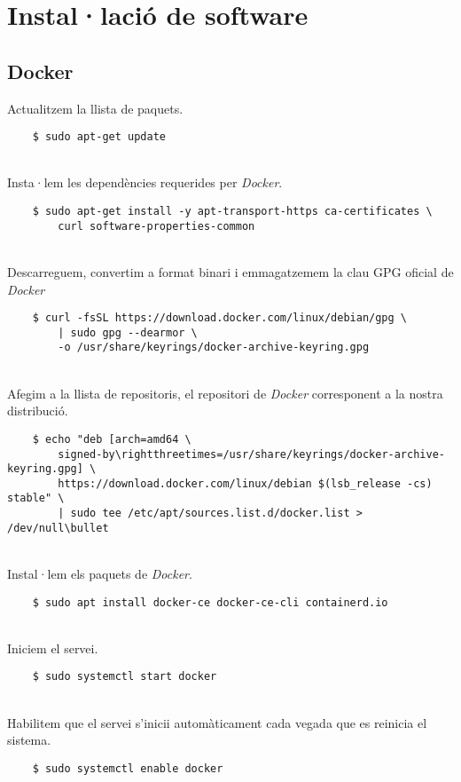 \chapter{Instal·lació de software}\label{ch:software-installation}

\section*{\gls{Docker}}\label{sec:docker-installation}

Actualitzem la llista de paquets.
\begin{verbatim}
    $ sudo apt-get update
\end{verbatim}

\noindent \\
    Insta·lem les dependències requerides per \textit{\gls{Docker}}.
\begin{verbatim}
    $ sudo apt-get install -y apt-transport-https ca-certificates \
        curl software-properties-common
\end{verbatim}

\noindent \\
Descarreguem, convertim a format binari i emmagatzemem la clau GPG oficial de \textit{\gls{Docker}}
\begin{verbatim}
    $ curl -fsSL https://download.docker.com/linux/debian/gpg \
        | sudo gpg --dearmor \
        -o /usr/share/keyrings/docker-archive-keyring.gpg
\end{verbatim}

\noindent \\
Afegim a la llista de repositoris, el repositori de \textit{\gls{Docker}} corresponent a la nostra distribució.
\begin{verbatim}
    $ echo "deb [arch=amd64 \
        signed-by\rightthreetimes=/usr/share/keyrings/docker-archive-keyring.gpg] \
        https://download.docker.com/linux/debian $(lsb_release -cs) stable" \
        | sudo tee /etc/apt/sources.list.d/docker.list > /dev/null\bullet
\end{verbatim}

\noindent \\
Instal·lem els paquets de \textit{\gls{Docker}}.
\begin{verbatim}
    $ sudo apt install docker-ce docker-ce-cli containerd.io
\end{verbatim}

\noindent \\
Iniciem el servei.
\begin{verbatim}
    $ sudo systemctl start docker
\end{verbatim}

\noindent \\
Habilitem que el servei s'inicii automàticament cada vegada que es reinicia el sistema.
\begin{verbatim}
    $ sudo systemctl enable docker
\end{verbatim}

